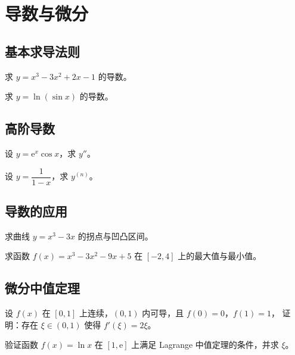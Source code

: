 \documentclass[pad]{kazetex}
\begin{document}
\section{导数与微分}

\subsection{基本求导法则}

\begin{problem}
  求 $y=x^3-3x^2+2x-1$ 的导数。
\end{problem}

\begin{problem}
  求 $y=\ln(\sin x)$ 的导数。
\end{problem}

\subsection{高阶导数}

\begin{problem}
  设 $y=\mathrm{e}^{x}\cos x$，求 $y''$。
\end{problem}

\begin{problem}
  设 $y=\dfrac{1}{1-x}$，求 $y^{(n)}$。
\end{problem}

\subsection{导数的应用}

\begin{problem}
  求曲线 $y=x^3-3x$ 的拐点与凹凸区间。
\end{problem}

\begin{problem}
  求函数 $f(x)=x^3-3x^2-9x+5$ 在 $[-2,4]$ 上的最大值与最小值。
\end{problem}

\subsection{微分中值定理}

\begin{problem}
  设 $f(x)$ 在 $[0,1]$ 上连续，$(0,1)$ 内可导，且 $f(0)=0$，$f(1)=1$，
  证明：存在 $\xi\in(0,1)$ 使得 $f'(\xi)=2\xi$。
\end{problem}

\begin{problem}
  验证函数 $f(x)=\ln x$ 在 $[1,\mathrm{e}]$ 上满足 Lagrange 中值定理的条件，并求 $\xi$。
\end{problem}
\end{document}
